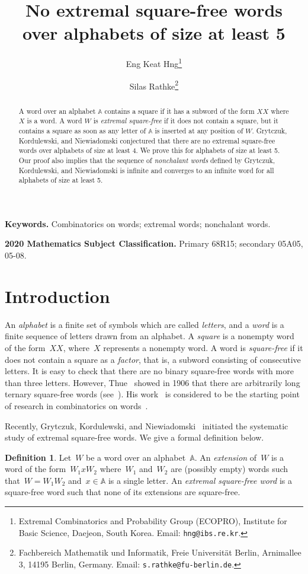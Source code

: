 \documentclass[12pt]{article}
\title{No extremal square-free words over alphabets of size at least 5}
\author{Eng Keat Hng\thanks{Extremal Combinatorics and Probability Group (ECOPRO), Institute for Basic Science, Daejeon, South Korea. Email: {\tt hng@ibs.re.kr}.} \and Silas Rathke\thanks{Fachbereich Mathematik und Informatik, Freie Universität Berlin, Arnimallee 3, 14195 Berlin, Germany. Email: {\tt s.rathke@fu-berlin.de}.}}
\date{}
\theoremstyle{plain}
\theoremstyle{definition}
\newtheorem{definition}[theorem]{Definition}
\newcommand{\A}{\mathbb A}
\begin{document}
	
	\maketitle
	
	\begin{abstract}
		A word over an alphabet $\mathbb A$ contains a square if it has a subword of the form $XX$ where $X$ is a word. A word $W$ is \emph{extremal square-free} if it does not contain a square, but it contains a square as soon as any letter of $\mathbb A$ is inserted at any position of $W$. Grytczuk, Kordulewski, and Niewiadomski conjectured that there are no extremal square-free words over alphabets of size at least 4. We prove this for alphabets of size at least 5. Our proof also implies that the sequence of \emph{nonchalant words} defined by Grytczuk, Kordulewski, and Niewiadomski is infinite and converges to an infinite word for all alphabets of size at least 5.
	\end{abstract}

	\medskip
    \noindent\textbf{Keywords.}
	Combinatorics on words; extremal words; nonchalant words.

	\smallskip
	\noindent\textbf{2020 Mathematics Subject Classification.}
	Primary 68R15; secondary 05A05, 05-08.
	
	\section{Introduction}
	
	An \emph{alphabet} is a finite set of symbols which are called \emph{letters}, and a \emph{word} is a finite sequence of letters drawn from an alphabet. A \emph{square} is a nonempty word of the form~$XX$, where~$X$ represents a nonempty word. A word is \emph{square-free} if it does not contain a square as a \emph{factor}, that is, a subword consisting of consecutive letters. It is easy to check that there are no binary square-free words with more than three letters. However, Thue~\cite{Thue1906} showed in 1906 that there are arbitrarily long ternary square-free words (see~\cite{Berstel}). His work~\cite{Thue1906,Thue1912} is considered to be the starting point of research in combinatorics on words~\cite{BerstelPerrin}.
	
	Recently, Grytczuk, Kordulewski, and Niewiadomski~\cite{GrytczukKordulewskiNiewiadomski} initiated the systematic study of extremal square-free words. We give a formal definition below.
	
	\begin{definition}
		Let~$W$ be a word over an alphabet~$\A$. An \emph{extension} of~$W$ is a word of the form~$W_1xW_2$ where~$W_1$ and~$W_2$ are (possibly empty) words such that~$W=W_1W_2$ and~$x\in\A$ is a single letter. An \emph{extremal square-free word} is a square-free word such that none of its extensions are square-free.
	\end{definition}
	
\end{document}
